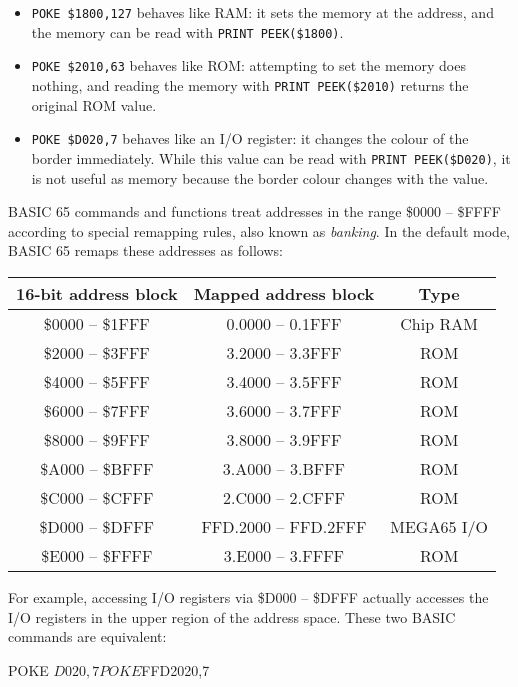 \begin{itemize}
\item \texttt{POKE \$1800,127} behaves like RAM: it sets the memory at the address, and the memory can be read with \texttt{PRINT PEEK(\$1800)}.
\item \texttt{POKE \$2010,63} behaves like ROM: attempting to set the memory does nothing, and reading the memory with \texttt{PRINT PEEK(\$2010)} returns the original ROM value.
\item \texttt{POKE \$D020,7} behaves like an I/O register: it changes the colour of the border immediately. While this value can be read with \texttt{PRINT PEEK(\$D020)}, it is not useful as memory because the border colour changes with the value.
\end{itemize}

\newpage

BASIC 65 commands and functions treat addresses in the range \$0000 -- \$FFFF according to special remapping rules, also known as {\em banking}. In the default mode, BASIC 65 remaps these addresses as follows:

\begin{center}
\begin{tabular}{|c|c|c|}
\hline
{\bf 16-bit address block} & {\bf Mapped address block} & {\bf Type} \\
\hline
\$0000 -- \$1FFF & 0.0000 -- 0.1FFF & Chip RAM \\
\hline
\$2000 -- \$3FFF & 3.2000 -- 3.3FFF & ROM \\
\hline
\$4000 -- \$5FFF & 3.4000 -- 3.5FFF & ROM \\
\hline
\$6000 -- \$7FFF & 3.6000 -- 3.7FFF & ROM \\
\hline
\$8000 -- \$9FFF & 3.8000 -- 3.9FFF & ROM \\
\hline
\$A000 -- \$BFFF & 3.A000 -- 3.BFFF & ROM \\
\hline
\$C000 -- \$CFFF & 2.C000 -- 2.CFFF & ROM \\
\hline
\$D000 -- \$DFFF & FFD.2000 -- FFD.2FFF & MEGA65 I/O\\
\hline
\$E000 -- \$FFFF & 3.E000 -- 3.FFFF & ROM \\
\hline
\end{tabular}
\end{center}

For example, accessing I/O registers via \$D000 -- \$DFFF actually accesses the I/O registers in the upper region of the address space. These two BASIC commands are equivalent:

\begin{basiccode}
POKE $D020,7

POKE $FFD2020,7
\end{basiccode}


